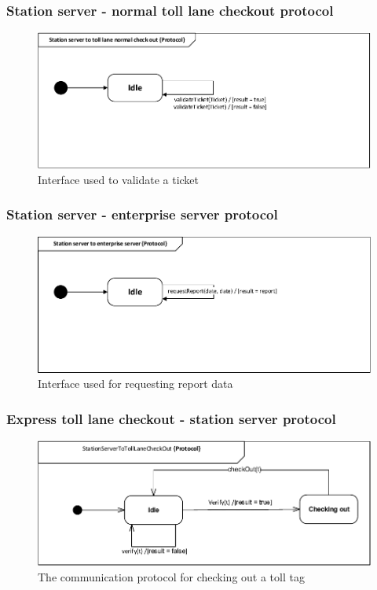 \subsubsection*{Station server - normal toll lane checkout protocol}
\begin{figure}[H]
\centering
\includegraphics[width=0.7\linewidth]{img/behaviour_state_machines/protocol_state_machines/protocol_state_machine_station_server_to_normal_lane_check_out}
\caption{Interface used to validate a ticket}
\label{fig:protocol_state_machine_station_server_to_normal_lane_check_out}
\end{figure}

\subsubsection*{Station server - enterprise server protocol}
\begin{figure}[H]
\centering
\includegraphics[width=0.7\linewidth]{img/behaviour_state_machines/protocol_state_machines/protocol_state_machine_station_server_to_enterprise_server}
\caption{Interface used for requesting report data}
\label{fig:protocol_state_machine_station_server_to_enterprise_server}
\end{figure}

\subsubsection*{Express toll lane checkout - station server protocol}
\begin{figure}[H]
\centering
\includegraphics[width=0.7\linewidth]{img/behaviour_state_machines/protocol_state_machines/protocol_state_machine_station_server_with_toll_computer_check_out}
\caption{The communication protocol for checking out a toll tag}
\label{fig:protocol_state_machine_station_server with_toll_computer_check_out}
\end{figure}

